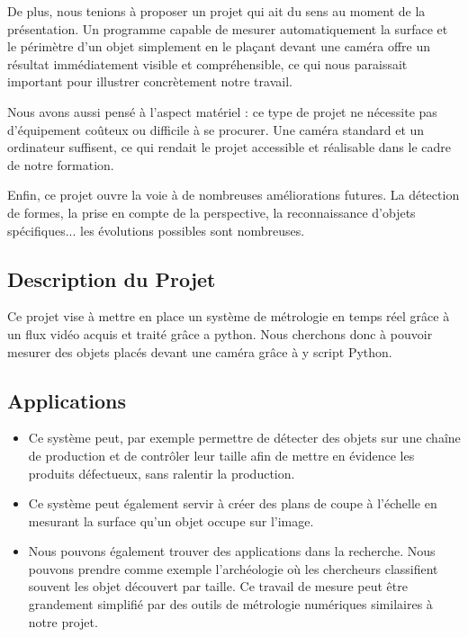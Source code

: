 \documentclass[titlepage]{article}
\begin{document}
	De plus, nous tenions à proposer un projet qui ait du sens au moment de la présentation. Un programme capable de mesurer automatiquement la surface et le périmètre d'un objet simplement en le plaçant devant une caméra offre un résultat immédiatement visible et compréhensible, ce qui nous paraissait important pour illustrer concrètement notre travail.
	
	Nous avons aussi pensé à l'aspect matériel : ce type de projet ne nécessite pas d'équipement coûteux ou difficile à se procurer. Une caméra standard et un ordinateur suffisent, ce qui rendait le projet accessible et réalisable dans le cadre de notre formation.
	
	Enfin, ce projet ouvre la voie à de nombreuses améliorations futures. La détection de formes, la prise en compte de la perspective, la reconnaissance d'objets spécifiques... les évolutions possibles sont nombreuses.
	\subsection{Description du Projet}
		Ce projet vise à mettre en place un système de métrologie en temps réel grâce à un flux vidéo acquis et traité grâce a python. Nous cherchons donc à pouvoir mesurer des objets placés devant une caméra grâce à y script Python.
	\subsection{Applications}
		\begin{itemize}
			\item 
			
			Ce système peut, par exemple permettre de détecter des objets sur une chaîne de production et de contrôler leur taille afin de mettre en évidence les produits défectueux, sans ralentir la production.
			\item 
			Ce système peut également servir à créer des plans de coupe à l'échelle en mesurant la surface qu'un objet occupe sur l'image.
			\item 
			Nous pouvons également trouver des applications dans la recherche. Nous pouvons prendre comme exemple l'archéologie où les chercheurs classifient souvent les objet découvert par taille. Ce travail de mesure peut être grandement simplifié par des outils de métrologie numériques similaires à notre projet.
		\end{itemize}
\end{document}
